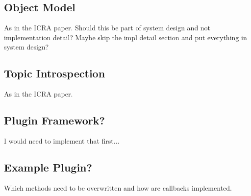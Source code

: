 \subsection{Object Model}
As in the ICRA paper. Should this be part of system design and not implementation detail? Maybe skip the impl detail section and put everything in system design?
\subsection{Topic Introspection}
As in the ICRA paper.
\subsection{Plugin Framework?}
I would need to implement that first...
\subsection{Example Plugin?}
Which methods need to be overwritten and how are callbacks implemented.
